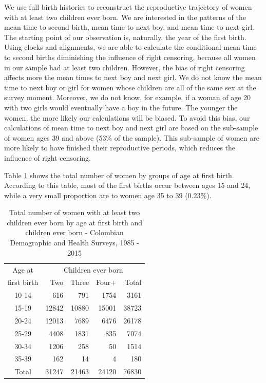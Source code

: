 \documentclass{article}
\begin{document}
We use full birth histories to reconstruct the reproductive trajectory of women with at least two children ever born. We are interested in the patterns of the mean time to second birth, mean time to next boy, and mean time to next girl. The starting point of our observation is, naturally, the year of the first birth. Using clocks and alignments, we are able to calculate the conditional mean time to second births diminishing the influence of right censoring, because all women in our sample had at least two children. However, the bias of right censoring affects more the mean times to next boy and next girl. We do not know the mean time to next boy or girl for women whose children are all of the same sex at the survey moment. Moreover, we do not know, for example, if a woman of age 20 with two girls would eventually have a boy in the future. The younger the women, the more likely our calculations will be biased. To avoid this bias, our calculations of mean time to next boy and next girl are based on the sub-sample of women ages 39 and above (53\% of the sample). This sub-sample of women are more likely to have finished their reproductive periods, which reduces the influence of right censoring.

Table \ref{tfert_01} shows the total number of women by groups of age at first birth. According to this table, most of the first births occur between ages 15 and 24, while a very small proportion are to women age 35 to 39 (0.23\%). 

\begin{table}[ht]
\centering
\caption{Total number of women with at least two children ever born by age at first birth and children ever born - Colombian Demographic and Health Surveys, 1985 - 2015}
\begin{tabular}{crrrr}
  \hline
Age at  & \multicolumn{4}{c}{Children ever born} \\ 
first birth & Two & Three & Four+ & Total \\ 
  \hline
10-14 & 616 & 791 & 1754 & 3161 \\ 
  15-19 & 12842 & 10880 & 15001 & 38723 \\ 
  20-24 & 12013 & 7689 & 6476 & 26178 \\ 
  25-29 & 4408 & 1831 & 835 & 7074 \\ 
  30-34 & 1206 & 258 & 50 & 1514 \\ 
  35-39 & 162 & 14 & 4 & 180 \\\hline 
  Total & 31247 & 21463 & 24120 & 76830 \\ 
   \hline
\end{tabular}
\label{tfert_01}
\end{table}
\end{document}
